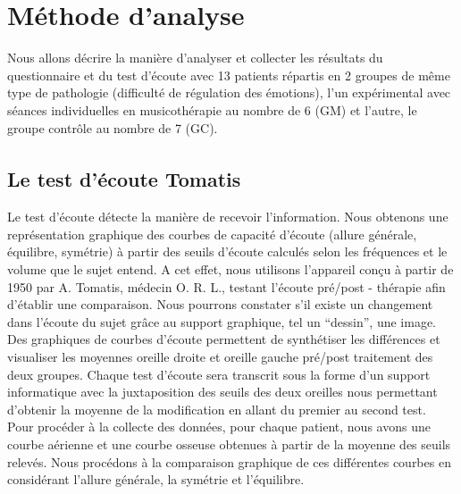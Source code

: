 \section{Méthode d'analyse}
Nous allons décrire la manière d'analyser et collecter les résultats du questionnaire et du test d'écoute 
avec 13 patients répartis en 2 groupes de même type de pathologie (difficulté de régulation des 
émotions), l'un expérimental avec séances individuelles en musicothérapie au nombre de 6 (GM) et 
l'autre, le groupe contrôle au 
nombre 
de 7 (GC).
\subsection {Le test d'écoute Tomatis\textsuperscript \textregistered }
Le test d'écoute détecte la manière de recevoir
l'information.
Nous obtenons une
représentation graphique des courbes de capacité d'écoute
(allure générale, équilibre, symétrie) à partir des seuils d'écoute
calculés selon les fréquences et le volume que le sujet entend.
A cet effet, nous utilisons l'appareil conçu à partir de 1950 par A. Tomatis, médecin
O. R. L., testant
l'écoute pré/post - thérapie
afin d'établir une comparaison.
Nous pourrons constater
s'il existe un changement dans l'écoute du sujet grâce au support graphique, tel un ``dessin'',
une image. %
\\
Des graphiques de courbes d'écoute permettent  de synthétiser les différences et visualiser les 
moyennes oreille droite et oreille gauche pré/post 
traitement des 
deux groupes. Chaque test d'écoute sera transcrit  sous la forme d'un support informatique avec 
la juxtaposition des seuils des deux oreilles nous permettant d'obtenir la moyenne de la 
modification en allant du 
premier au second test.
\\
Pour procéder à la collecte des données, pour chaque patient, nous avons une courbe aérienne et une 
courbe osseuse obtenues à partir de  la moyenne des seuils relevés.
Nous procédons à la comparaison graphique de ces différentes courbes en considérant l'allure générale, 
la symétrie et l'équilibre.
